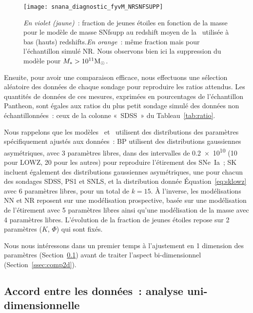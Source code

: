 \documentclass[../main/main.tex]{subfiles}
\begin{document}
\begin{SCfigure}[1][h!]
    \centering
    \texttt{[image: snana\_diagnostic\_fyvM\_NRSNFSUPP]}
    \caption[Fraction de jeunes étoiles en fonction de la masse pour le modèle
    de masse SNfsupp]{\textit{En violet (jaune)}~: fraction de jeunes étoiles en
        fonction de la masse pour le modèle de masse SNfsupp au redshift moyen
        de la \hostlib\ utilisée à bas (hauts) redshifts.\smallbreak \textit{En
        orange}~: même fraction mais pour l'échantillon simulé NR. Nous
        observons bien ici la suppression du modèle pour
    $M_* > 10^{11}\si{\Msun}$.}
    \label{fig:fyvMsupp}
\end{SCfigure}

Ensuite, pour avoir une comparaison efficace, nous effectuons une sélection
aléatoire des données de chaque sondage pour reproduire les ratios attendus. Les
quantités de données de ces mesures, exprimées en pourcentages de l'échantillon
Pantheon, sont égales aux ratios du plus petit sondage simulé des données non
échantillonnées~: ceux de la colonne «~SDSS~» du Tableau~\ref{tab:ratio}.

Nous rappelons que les modèles~
et~ utilisent des distributions des paramètres
spécifiquement ajustés aux données~: BP utilisent des distributions gaussiennes
asymétriques, avec 3 paramètres libres, dans des intervalles de
\SI{0.2e10}{\Msun} (10 pour LOWZ, 20 pour les autres) pour reproduire
l'étirement des SNe~Ia~; SK incluent également des distributions gaussiennes
asymétriques, une pour chacun des sondages SDSS, PS1 et SNLS, et la distribution
donnée Équation~\ref{eq:sklowz} avec 6 paramètres libres, pour un total de $k =
15$. À l'inverse, les modélisations NN et NR reposent sur une modélisation
prospective, basée sur une modélisation de l'étirement avec 5 paramètres libres
ainsi qu'une modélisation de la masse avec 4 paramètres libres. L'évolution de
la fraction de jeunes étoiles repose sur 2 paramètres ($K$, $\Phi$) qui sont
fixés.

Nous nous intéressons dans un premier temps à l'ajustement en 1 dimension des
paramètres (Section~\ref{ssec:comp1d}) avant de traiter l'aspect bi-dimensionnel
(Section~\ref{ssec:comp2d}).

\subsection{Accord entre les données~: analyse uni-dimensionnelle}\label{ssec:comp1d}
\end{document}
